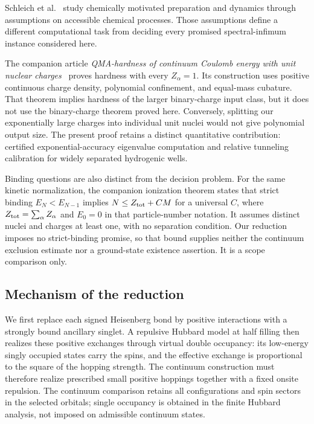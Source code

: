 Schleich et al.~\cite{Schleich2026} study chemically motivated preparation
and dynamics through assumptions on accessible chemical processes. Those
assumptions define a different computational task from deciding every
promised spectral-infimum instance considered here.

The companion article \emph{QMA-hardness of continuum Coulomb energy with
unit nuclear charges}~\cite[Theorem~1]{UnitCoulomb2026} proves hardness
with every $Z_\alpha=1$. Its construction uses positive continuous charge
density, polynomial confinement, and equal-mass cubature. That theorem
implies hardness of the larger binary-charge input class, but it does not
use the binary-charge theorem proved here. Conversely, splitting our
exponentially large charges into individual unit nuclei would not give
polynomial output size. The present proof retains a distinct quantitative
contribution: certified exponential-accuracy eigenvalue computation and
relative tunneling calibration for widely separated hydrogenic wells.

Binding questions are also distinct from the decision problem. For the
same kinetic normalization, the companion ionization theorem
\cite[Theorem~1.1]{UniformExcessCharge2026} states that strict binding
$E_N<E_{N-1}$ implies $N\le Z_{\rm tot}+CM$ for a universal $C$, where
$Z_{\rm tot}=\sum_\alpha Z_\alpha$ and $E_0=0$ in that particle-number
notation. It assumes distinct nuclei and charges at least one, with no
separation condition. Our reduction imposes no strict-binding promise,
so that bound supplies neither the continuum exclusion estimate nor a
ground-state existence assertion. It is a scope comparison only.

\subsection{Mechanism of the reduction}

We first replace each signed Heisenberg bond by positive interactions with a strongly bound ancillary singlet. A repulsive Hubbard model at half filling then realizes these positive exchanges through virtual double occupancy: its low-energy singly occupied states carry the spins, and the effective exchange is proportional to the square of the hopping strength. The continuum construction must therefore realize prescribed small positive hoppings together with a fixed onsite repulsion. The continuum comparison retains all configurations and spin sectors in the selected orbitals; single occupancy is obtained in the finite Hubbard analysis, not imposed on admissible continuum states.


